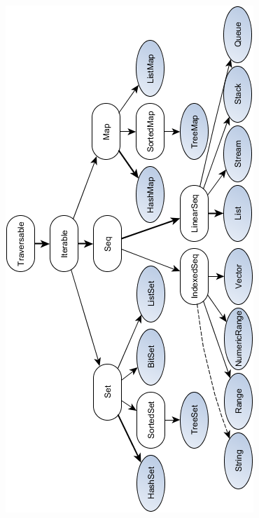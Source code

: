 \documentclass[a4paper,twoside,10pt,landscape]{article}
\begin{document}
\begin{multicols}{3}
\begin{center}
    \includegraphics[scale=.70]{scala-collection-immutable.png}
    \label{fig:scala-collection-immutable}
\end{center}


\end{multicols}
\end{document}
